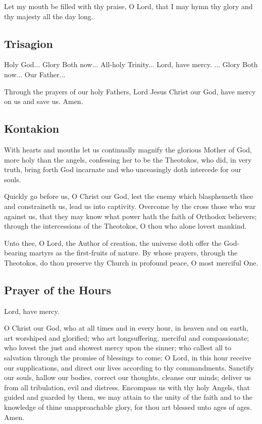 Let my mouth be filled with thy praise, O Lord, that I may hymn thy glory and thy majesty all the day long. 

\subsection{Trisagion}

Holy God... Glory  Both now... All-holy Trinity... Lord, have mercy. ... Glory  Both now... Our Father...

Through the prayers of our holy Fathers, Lord Jesus Christ our God, have mercy on us and save us. Amen.

\subsection{Kontakion}


 With hearts and mouths let us continually magnify the glorious Mother of God, more holy than the angels, confessing her to be the Theotokos, who did, in very truth, bring forth God incarnate and who unceasingly doth intercede for our souls.

 Quickly go before us, O Christ our God, lest the enemy which blasphemeth thee and constraineth us, lead us into captivity. Overcome by the cross those who war against us, that they may know what power hath the faith of Orthodox believers; through the intercessions of the Theotokos, O thou who alone lovest mankind.

 Unto thee, O Lord, the Author of creation, the universe doth offer the God-bearing martyrs as the first-fruits of nature. By whose prayers, through the Theotokos, do thou preserve thy Church in profound peace, O most merciful One.


\subsection{Prayer of the Hours}

Lord, have mercy. 

O Christ our God, who at all times and in every hour, in heaven and on earth, art worshiped and glorified; who art longsuffering, merciful and compassionate; who lovest the just and showest mercy upon the sinner; who callest all to salvation through the promise of blessings to come; O Lord, in this hour receive our supplications, and direct our lives according to thy commandments. Sanctify our souls, hallow our bodies, correct our thoughts, cleanse our minds; deliver us from all tribulation, evil and distress. Encompass us with thy holy Angels, that guided and guarded by them, we may attain to the unity of the faith and to the knowledge of thine unapproachable glory, for thou art blessed unto ages of ages. Amen.

